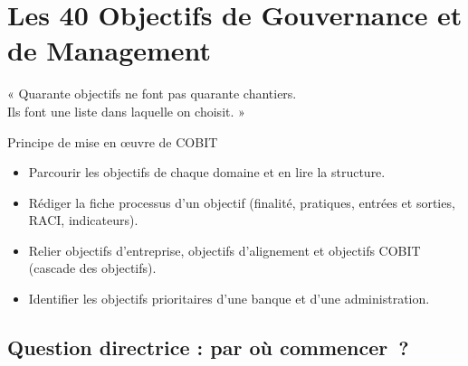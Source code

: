 
\chapter{Les 40 Objectifs de Gouvernance et de Management}
\label{chap:cobit-objectifs}

\epigraph{%
    « Quarante objectifs ne font pas quarante chantiers.\\
    Ils font une liste dans laquelle on choisit. »%
}{Principe de mise en œuvre de COBIT}


\begin{boxobjectifs}
\begin{itemize}
    \item Parcourir les objectifs de chaque domaine et en lire la
          structure.
    \item Rédiger la fiche processus d'un objectif (finalité, pratiques,
          entrées et sorties, RACI, indicateurs).
    \item Relier objectifs d'entreprise, objectifs d'alignement et
          objectifs COBIT (cascade des objectifs).
    \item Identifier les objectifs prioritaires d'une banque et d'une
          administration.
\end{itemize}
\end{boxobjectifs}

\bigskip

\section*{Question directrice : par où commencer~?}

